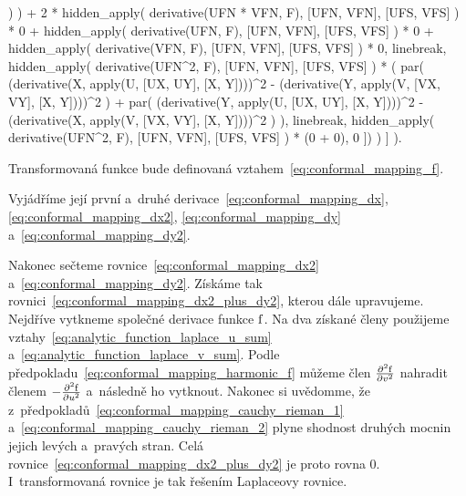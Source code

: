 \begin{prolog}
						)
					) +
					2 * hidden_apply(
						derivative(UFN * VFN, F),
						[UFN, VFN],
						[UFS, VFS]
					) * 0 +
					hidden_apply(
						derivative(UFN, F),
						[UFN, VFN],
						[UFS, VFS]
					) * 0
					+					
					hidden_apply(
						derivative(VFN, F),
						[UFN, VFN],
						[UFS, VFS]
					) * 0,
					linebreak,
					hidden_apply(
						derivative(UFN^2, F),
						[UFN, VFN],
						[UFS, VFS]
					) * (
						par(
							(derivative(X, apply(U, [UX, UY], [X, Y])))^2 -
							(derivative(Y, apply(V, [VX, VY], [X, Y])))^2
						)
						+
						par(
							(derivative(Y, apply(U, [UX, UY], [X, Y])))^2 -
							(derivative(X, apply(V, [VX, VY], [X, Y])))^2
						)						
					),
					linebreak,
					hidden_apply(
						derivative(UFN^2, F),
						[UFN, VFN],
						[UFS, VFS]
					) * (0 + 0),
					0
				])
			)
		]
	).
\end{prolog}

Transformovaná funkce bude definovaná vztahem~\eqref{eq:conformal_mapping_f}.

Vyjádříme její první a~druhé derivace~\eqref{eq:conformal_mapping_dx}, \eqref{eq:conformal_mapping_dx2}, \eqref{eq:conformal_mapping_dy} a~\eqref{eq:conformal_mapping_dy2}.


Nakonec sečteme rovnice~\eqref{eq:conformal_mapping_dx2} a~\eqref{eq:conformal_mapping_dy2}. Získáme tak rovnici~\eqref{eq:conformal_mapping_dx2_plus_dy2}, kterou dále upravujeme. Nejdříve vytkneme společné derivace funkce \(\mathrm{f}\). Na dva získané členy použijeme vztahy~\eqref{eq:analytic_function_laplace_u_sum} a~\eqref{eq:analytic_function_laplace_v_sum}. Podle předpokladu~\eqref{eq:conformal_mapping_harmonic_f} můžeme člen \(\frac{\partial^2 \mathrm{f}}{\partial v^2}\) nahradit členem \(-\frac{\partial^2 \mathrm{f}}{\partial u^2}\) a~následně ho vytknout. Nakonec si uvědomme, že z~předpokladů~\eqref{eq:conformal_mapping_cauchy_rieman_1} a~\eqref{eq:conformal_mapping_cauchy_rieman_2} plyne shodnost druhých mocnin jejich levých a~pravých stran. Celá rovnice~\eqref{eq:conformal_mapping_dx2_plus_dy2} je proto rovna 0. I~transformovaná rovnice je tak řešením Laplaceovy rovnice.

